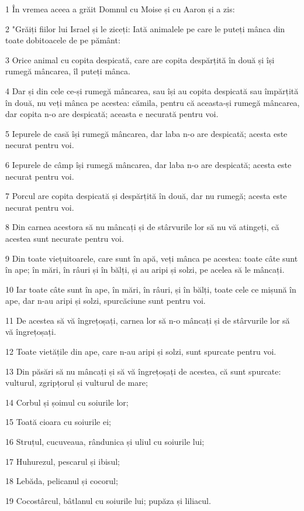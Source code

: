 \par 1 În vremea aceea a grăit Domnul cu Moise și cu Aaron și a zis:
\par 2 "Grăiți fiilor lui Israel și le ziceți: Iată animalele pe care le puteți mânca din toate dobitoacele de pe pământ:
\par 3 Orice animal cu copita despicată, care are copita despărțită în două și își rumegă mâncarea, îl puteți mânca.
\par 4 Dar și din cele ce-și rumegă mâncarea, sau își au copita despicată sau împărțită în două, nu veți mânca pe acestea: cămila, pentru că aceasta-și rumegă mâncarea, dar copita n-o are despicată; aceasta e necurată pentru voi.
\par 5 Iepurele de casă își rumegă mâncarea, dar laba n-o are despicată; acesta este necurat pentru voi.
\par 6 Iepurele de câmp își rumegă mâncarea, dar laba n-o are despicată; acesta este necurat pentru voi.
\par 7 Porcul are copita despicată și despărțită în două, dar nu rumegă; acesta este necurat pentru voi.
\par 8 Din carnea acestora să nu mâncați și de stârvurile lor să nu vă atingeți, că acestea sunt necurate pentru voi.
\par 9 Din toate viețuitoarele, care sunt în apă, veți mânca pe acestea: toate câte sunt în ape; în mări, în râuri și în bălți, și au aripi și solzi, pe acelea să le mâncați.
\par 10 Iar toate câte sunt în ape, în mări, în râuri, și în bălți, toate cele ce mișună în ape, dar n-au aripi și solzi, spurcăciune sunt pentru voi.
\par 11 De acestea să vă îngrețoșați, carnea lor să n-o mâncați și de stârvurile lor să vă îngrețoșați.
\par 12 Toate vietățile din ape, care n-au aripi și solzi, sunt spurcate pentru voi.
\par 13 Din păsări să nu mâncați și să vă îngrețoșați de acestea, că sunt spurcate: vulturul, zgripțorul și vulturul de mare;
\par 14 Corbul și șoimul cu soiurile lor;
\par 15 Toată cioara cu soiurile ei;
\par 16 Struțul, cucuveaua, rândunica și uliul cu soiurile lui;
\par 17 Huhurezul, pescarul și ibisul;
\par 18 Lebăda, pelicanul și cocorul;
\par 19 Cocostârcul, bâtlanul cu soiurile lui; pupăza și liliacul.
